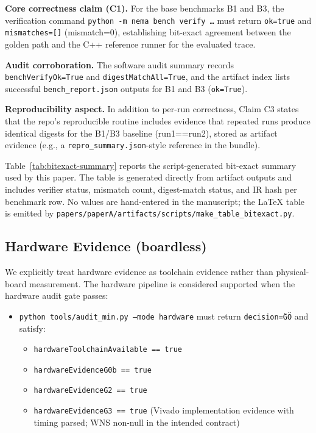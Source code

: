 \textbf{Core correctness claim (C1).} For the base benchmarks B1 and B3, the verification command \texttt{python -m nema bench verify \ldots} must return \texttt{ok=true} and \texttt{mismatches=[]} (mismatch=0), establishing bit-exact agreement between the golden path and the C++ reference runner for the evaluated trace.

\textbf{Audit corroboration.} The software audit summary records \texttt{benchVerifyOk=True} and \texttt{digestMatchAll=True}, and the artifact index lists successful \texttt{bench\_report.json} outputs for B1 and B3 (\texttt{ok=True}).

\textbf{Reproducibility aspect.} In addition to per-run correctness, Claim C3 states that the repo's reproducible routine includes evidence that repeated runs produce identical digests for the B1/B3 baseline (run1==run2), stored as artifact evidence (e.g., a \texttt{repro\_summary.json}-style reference in the bundle).

Table~\ref{tab:bitexact-summary} reports the script-generated bit-exact summary used by this paper. The table is generated directly from artifact outputs and includes verifier status, mismatch count, digest-match status, and IR hash per benchmark row. No values are hand-entered in the manuscript; the LaTeX table is emitted by \texttt{papers/paperA/artifacts/scripts/make\_table\_bitexact.py}.

\begin{table}[t]
\centering
\scriptsize

\caption{Bit-exact summary generated from artifact evidence (\texttt{results\_bitexact.tex}).}
\label{tab:bitexact-summary}
\end{table}

\subsection{Hardware Evidence (boardless)}

We explicitly treat hardware evidence as toolchain evidence rather than physical-board measurement. The hardware pipeline is considered supported when the hardware audit gate passes:
\begin{itemize}
\item \texttt{python tools/audit\_min.py --mode hardware} must return \texttt{decision=\"GO\"} and satisfy:
\begin{itemize}
\item \texttt{hardwareToolchainAvailable == true}
\item \texttt{hardwareEvidenceG0b == true}
\item \texttt{hardwareEvidenceG2 == true}
\item \texttt{hardwareEvidenceG3 == true} (Vivado implementation evidence with timing parsed; WNS non-null in the intended contract)
\end{itemize}
\end{itemize}

